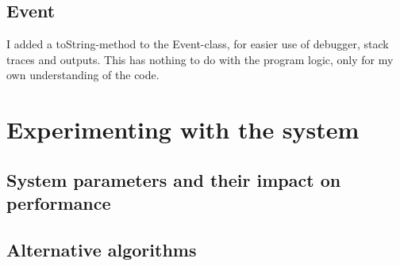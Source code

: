 \documentclass[norsk,a4paper]{article}
\begin{document}
\subsection{Event}
I added a toString-method to the Event-class, for easier use of debugger, stack
traces and outputs. This has nothing to do with the program logic, only for my
own understanding of the code.

\section{Experimenting with the system}
\subsection{System parameters and their impact on performance}
\subsection{Alternative algorithms}
\end{document}
